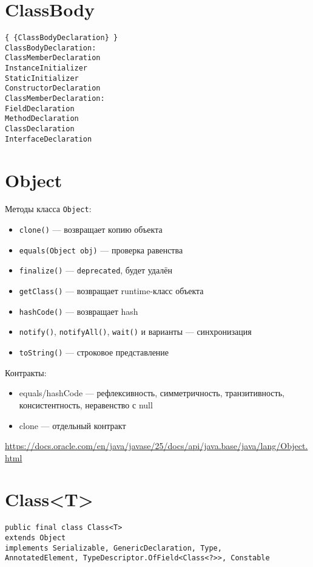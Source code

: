 \documentclass[a4paper,12pt]{article}
\begin{document}
\section*{ClassBody}
\begin{verbatim}
{ {ClassBodyDeclaration} }
ClassBodyDeclaration:
ClassMemberDeclaration
InstanceInitializer
StaticInitializer
ConstructorDeclaration
ClassMemberDeclaration:
FieldDeclaration
MethodDeclaration
ClassDeclaration
InterfaceDeclaration
\end{verbatim}

\section*{Object}
Методы класса \texttt{Object}:
\begin{itemize}
  \item \texttt{clone()} — возвращает копию объекта
  \item \texttt{equals(Object obj)} — проверка равенства
  \item \texttt{finalize()} — \texttt{deprecated}, будет удалён
  \item \texttt{getClass()} — возвращает runtime-класс объекта
  \item \texttt{hashCode()} — возвращает hash
  \item \texttt{notify()}, \texttt{notifyAll()}, \texttt{wait()} и варианты — синхронизация
  \item \texttt{toString()} — строковое представление
\end{itemize}

Контракты:
\begin{itemize}
  \item equals/hashCode — рефлексивность, симметричность, транзитивность, консистентность, неравенство с null
  \item clone — отдельный контракт
\end{itemize}

\url{https://docs.oracle.com/en/java/javase/25/docs/api/java.base/java/lang/Object.html}

\section*{Class<T>}
\begin{verbatim}
public final class Class<T>
extends Object
implements Serializable, GenericDeclaration, Type,
AnnotatedElement, TypeDescriptor.OfField<Class<?>>, Constable
\end{verbatim}
\end{document}
